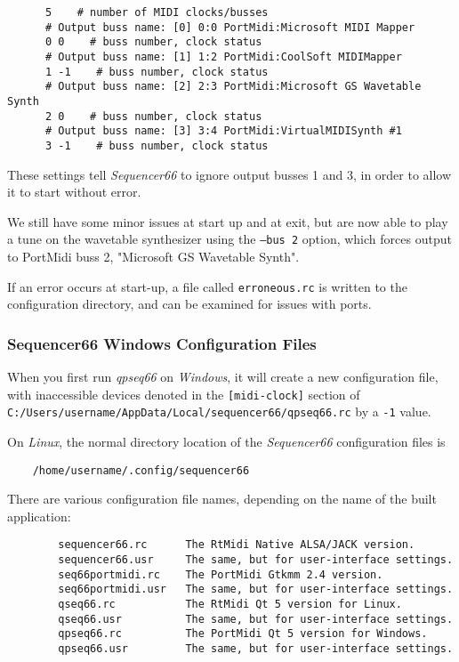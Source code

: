 \begin{verbatim}
      5    # number of MIDI clocks/busses
      # Output buss name: [0] 0:0 PortMidi:Microsoft MIDI Mapper
      0 0    # buss number, clock status
      # Output buss name: [1] 1:2 PortMidi:CoolSoft MIDIMapper
      1 -1    # buss number, clock status
      # Output buss name: [2] 2:3 PortMidi:Microsoft GS Wavetable Synth
      2 0    # buss number, clock status
      # Output buss name: [3] 3:4 PortMidi:VirtualMIDISynth #1
      3 -1    # buss number, clock status
\end{verbatim}

   These settings tell \textsl{Sequencer66} to ignore output busses 1 and 3,
   in order to allow it to start without error.

    We still have some minor issues at start up and at exit, but are now able
    to play a tune on the wavetable synthesizer using the
    \texttt{--bus 2} option, which forces output to PortMidi buss 2,
    "Microsoft GS Wavetable Synth".

    If an error occurs at start-up, a file called \texttt{erroneous.rc} is
    written to the configuration directory, and can be examined for issues with
    ports.

\subsubsection{Sequencer66 Windows Configuration Files}
\label{subsubsec:qt_portmidi_windows_setup_config}

    When you first run \textsl{qpseq66}
    on \textsl{Windows}, it will create a new configuration
    file, with inaccessible devices denoted in the
    \texttt{[midi-clock]} section of
    \texttt{C:/Users/username/AppData/Local/sequencer66/qpseq66.rc}
    by a \texttt{-1} value.

    On \textsl{Linux},
    the normal directory location of the \textsl{Sequencer66} configuration
    files is

\begin{verbatim}
    /home/username/.config/sequencer66
\end{verbatim}

   There are various configuration file names, depending on the name of the
   built application:

\begin{verbatim}
        sequencer66.rc      The RtMidi Native ALSA/JACK version.
        sequencer66.usr     The same, but for user-interface settings.
        seq66portmidi.rc    The PortMidi Gtkmm 2.4 version.
        seq66portmidi.usr   The same, but for user-interface settings.
        qseq66.rc           The RtMidi Qt 5 version for Linux.
        qseq66.usr          The same, but for user-interface settings.
        qpseq66.rc          The PortMidi Qt 5 version for Windows.
        qpseq66.usr         The same, but for user-interface settings.
\end{verbatim}

